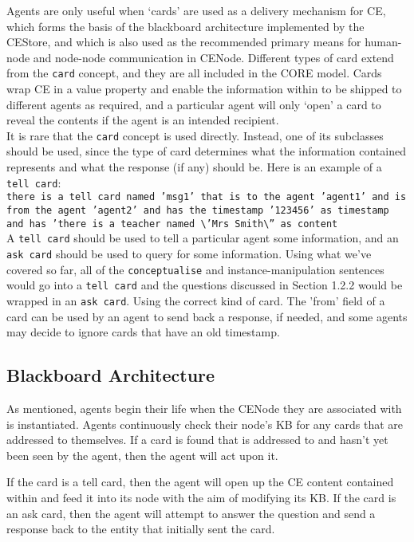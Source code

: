 \documentclass{scrartcl}
\begin{document}
Agents are only useful when `cards' are used as a delivery mechanism for CE, which forms the basis of the blackboard architecture implemented by the CEStore, and which is also used as the recommended primary means for human-node and node-node communication in CENode. Different types of card extend from the \texttt{card} concept, and they are all included in the CORE model. Cards wrap CE in a value property and enable the information within to be shipped to different agents as required, and a particular agent will only `open' a card to reveal the contents if the agent is an intended recipient. \\

It is rare that the \texttt{card} concept is used directly. Instead, one of its subclasses should be used, since the type of card determines what the information contained represents and what the response (if any) should be. Here is an example of a \texttt{tell card}:\\
\texttt{there is a tell card named 'msg1' that is to the agent 'agent1' and is from the agent 'agent2' and has the timestamp '123456' as timestamp and has 'there is a teacher named \textbackslash'Mrs Smith\textbackslash'' as content}\\

A \texttt{tell card} should be used to tell a particular agent some information, and an \texttt{ask card} should be used to query for some information. Using what we've covered so far, all of the \texttt{conceptualise} and instance-manipulation sentences would go into a \texttt{tell card} and the questions discussed in Section 1.2.2 would be wrapped in an \texttt{ask card}. Using the correct kind of card. The 'from' field of a card can be used by an agent to send back a response, if needed, and some agents may decide to ignore cards that have an old timestamp. 


\subsection{Blackboard Architecture}
\label{blackboard_architecture}

As mentioned, agents begin their life when the CENode they are associated with is instantiated. Agents continuously check their node's KB for any cards that are addressed to themselves. If a card is found that is addressed to and hasn't yet been seen by the agent, then the agent will act upon it.

If the card is a tell card, then the agent will open up the CE content contained within and feed it into its node with the aim of modifying its KB. If the card is an ask card, then the agent will attempt to answer the question and send a response back to the entity that initially sent the card.
\end{document}
